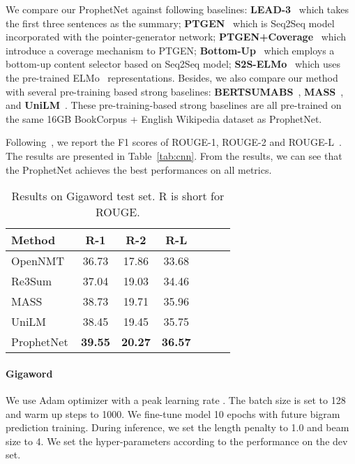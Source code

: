 \documentclass[11pt,a4paper]{article}
\begin{document}
We compare our ProphetNet against following baselines:
\textbf{LEAD-3}~\cite{nallapati2016abstractive} which takes the first three sentences as the summary;
\textbf{PTGEN}~\cite{see2017get} which is Seq2Seq model incorporated with the pointer-generator network;
\textbf{PTGEN+Coverage}~\cite{see2017get} which introduce a coverage mechanism to PTGEN;
\textbf{Bottom-Up}~\cite{gehrmann2018bottom} which employs a bottom-up content selector based on Seq2Seq model;
\textbf{S2S-ELMo}~\cite{edunov2019pre} which uses the pre-trained ELMo~\cite{peters2018deep} representations.
Besides, we also compare our method with several pre-training based strong baselines: \textbf{BERTSUMABS}~\cite{liu2019text}, \textbf{MASS}~\cite{song2019mass}, and \textbf{UniLM}~\cite{dong2019unified}. 
These pre-training-based strong baselines are all pre-trained on the same 16GB BookCorpus + English Wikipedia dataset as ProphetNet. 

Following~\citet{see2017get}, we report the F1 scores of ROUGE-1, ROUGE-2 and ROUGE-L~\cite{lin2004rouge}.~\citet{du2017learning}
The results are presented in Table~\ref{tab:cnn}.
From the results, we can see that the ProphetNet achieves the best performances on all metrics.


\begin{table}[th] 
\small
\begin{center}
  \begin{tabular}{lcccccl} 
    \toprule
    Method & R-1 & R-2 & R-L \\
    \midrule
 OpenNMT~\cite{klein2017opennmt} & 36.73 & 17.86 & 33.68 \\
Re3Sum~\cite{cao2018retrieve} & 37.04 & 19.03 & 34.46 \\
MASS~\cite{song2019mass} & 38.73 & 19.71 & 35.96 \\
 UniLM~\cite{dong2019unified} & 38.45  & 19.45 &   35.75\\
 \hline
 ProphetNet &   \textbf{39.55}  & \textbf{20.27}   & \textbf{36.57}\\
  \bottomrule
\end{tabular}
\end{center}
\caption{Results on Gigaword test set. R is short for ROUGE.}\label{tab:gigaword}
\end{table}

\paragraph{Gigaword} 
We use Adam optimizer with a peak learning rate .
The batch size is set to 128 and warm up steps to 1000. We fine-tune model 10 epochs with future bigram prediction training.
During inference, we set the length penalty to 1.0 and beam size to 4. We set the hyper-parameters according to the performance on the dev set.
\end{document}
